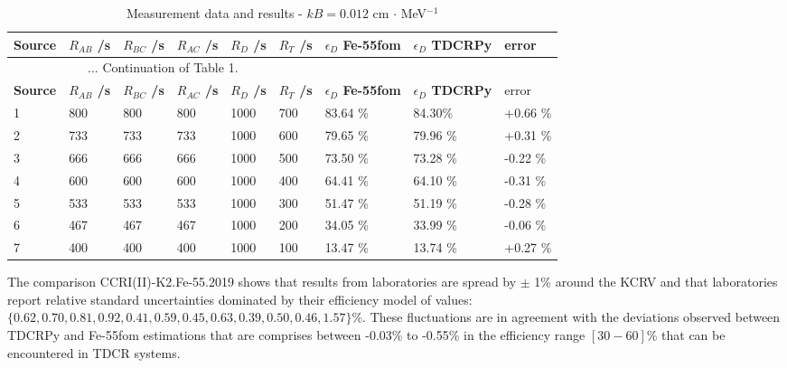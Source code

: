 \documentclass[12pt]{iopart}
\begin{document}
\begingroup
\footnotesize
\begin{longtable}[l]{| p{} | p{} | p{} | p{} | p{} | p{} |p{} |p{} |p{} |} 
\caption{Measurement data and results - $kB = 0.012$ cm $\cdot$ MeV$^{-1}$}
\label{Table1} \\ 
\hline
\textbf{Source} & \textbf{$R_{AB}$ /s} & \textbf{$R_{BC}$ /s} & \textbf{$R_{AC}$ /s} & \textbf{$R_{D}$ /s} & \textbf{$R_{T}$ /s} & \textbf{$\epsilon_{D}$ Fe-55fom} & \textbf{$\epsilon_{D}$ TDCRPy} & error \\ 
\endfirsthead
\multicolumn{6}{c}{... Continuation of Table 1.}\\ 
\hline
 \textbf{Source} & \textbf{$R_{AB}$ /s} & \textbf{$R_{BC}$ /s} & \textbf{$R_{AC}$ /s} & \textbf{$R_{D}$ /s} & \textbf{$R_{T}$ /s} & \textbf{$\epsilon_{D}$ Fe-55fom} & \textbf{$\epsilon_{D}$ TDCRPy} & error \\   \hline 
\endhead
\hline
 1 & 800    & 800     & 800    & 1000    &  700   &  83.64 \% &  84.30\% & +0.66 \% \\
 2 & 733    & 733     & 733    & 1000    &  600   &  79.65 \% &  79.96 \% & +0.31 \% \\
 3 & 666    & 666     & 666    & 1000    &  500   &  73.50 \% &  73.28 \% & -0.22 \% \\
 4 & 600    & 600     & 600    & 1000    &  400   &  64.41 \% &  64.10 \% &  -0.31 \% \\
 5 & 533    & 533     & 533    & 1000    &  300   &  51.47 \% &  51.19 \% &  -0.28 \% \\
 6 & 467    & 467     & 467    & 1000    &  200   &  34.05 \% &  33.99 \% &  -0.06 \% \\
 7 & 400    & 400     & 400    & 1000    &  100   &  13.47 \% &  13.74 \% &  +0.27 \% \\
\hline
\end{longtable} 
\endgroup

The comparison CCRI(II)-K2.Fe-55.2019 shows that results from laboratories are spread by $\pm$ 1\% around the KCRV and that laboratories report relative standard uncertainties dominated by their efficiency model of values: $\{0.62, 0.70, 0.81, 0.92, 0.41, 0.59, 0.45, 0.63, 0.39, 0.50, 0.46, 1.57\}$\%.
These fluctuations are in agreement with the deviations observed between TDCRPy and Fe-55fom estimations that are comprises between -0.03\% to -0.55\% in the efficiency range $[30-60]$\% that can be encountered in TDCR systems.
\end{document}
